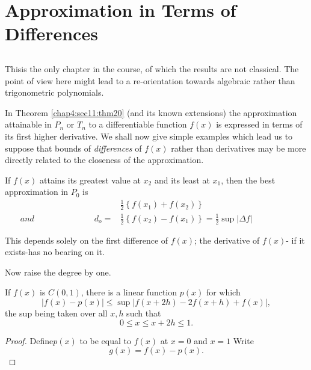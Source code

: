 \chapter{Approximation in Terms of Differences}\label{chap6}

\setcounter{section}{14}
\section{}\label{chap6:sec15}

 This\pageoriginale is the only  chapter in the course, of which the results are not
 classical. The point of view here might lead to a re-orientation
 towards algebraic rather than trigonometric polynomials. 
 
 In Theorem \ref{chap4:sec11:thm20} (and its known extensions) the approximation
 attainable in $P_n$ or $T_n$ to a differentiable function $f(x)$ is
 expressed in terms of its first higher derivative. We shall now give
 simple examples which lead us to suppose that bounds of
 \textit{differences} of $f(x)$ rather than derivatives may be more
 directly related to the closeness of the approximation. 

 \begin{example}\label{chap6:sec15:exp1}%
   If $f(x)$ attains its greatest value at $x_2$ and its least at
   $x_1$, then the best approximation in $P_0$ is  
   \begin{align*}
     &\frac{1}{2} \left\{f(x_1) +f(x_2) \right\}\\
     and  \hspace{3cm} d_o =  &\frac{1}{2} \left\{f(x_2) -f(x_1) \right\}=
     \frac{1}{2} \sup |  \Delta f |\hspace{2cm} 
   \end{align*}
 \end{example} 
 
 This depends solely on the first difference of $f(x)$; the derivative
 of $f(x)$- if it exists-has no  bearing on it. 
 
Now raise the degree by one.
\begin{example}\label{chap6:sec15:exp2} %
  If $f(x)$ is $C(0,1)$, there is a linear function $p(x)$ for which 
  $$
  | f(x) - p(x) | \le \sup |f (x+2h) - 2f(x+h) +f(x) |,
  $$
  the  sup being taken over all $x,h$ such that 
  $$
  0 \le x \le x+ 2h \le 1.
  $$
\end{example} 

\begin{proof}
  Define\pageoriginale $p(x)$ to be equal to $f(x)$ at $x=0$ and $x=1$ Write
  $$
  g(x) = f(x) -p(x).
  $$
\end{proof} 
 

